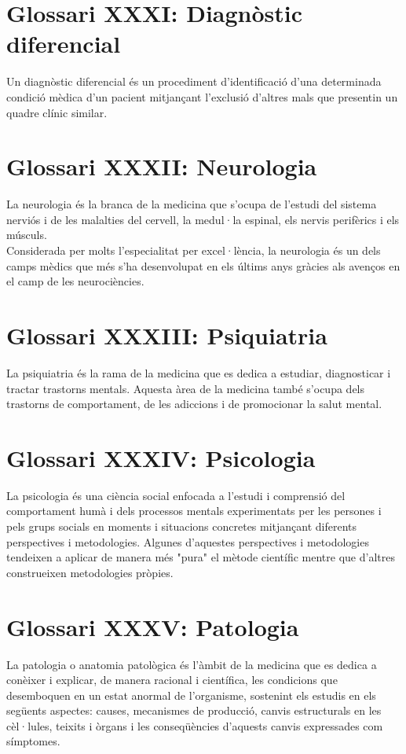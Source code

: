 \documentclass[a4paper,12pt]{report}
\begin{document}
\section*{Glossari XXXI: Diagnòstic diferencial}
Un diagnòstic diferencial és un procediment d'identificació d'una determinada condició mèdica d'un pacient mitjançant l'exclusió d'altres mals que presentin un quadre clínic similar.
\section*{Glossari XXXII: Neurologia}
La neurologia és la branca de la medicina que s'ocupa de l'estudi del sistema nerviós i de les malalties del cervell, la medul·la espinal, els nervis perifèrics i els músculs.\\
Considerada per molts l'especialitat per excel·lència, la neurologia és un dels camps mèdics que més s'ha desenvolupat en els últims anys gràcies als avenços en el camp de les neurociències.
\section*{Glossari XXXIII: Psiquiatria}
La psiquiatria és la rama de la medicina que es dedica a estudiar, diagnosticar i tractar trastorns mentals. Aquesta àrea de la medicina també s'ocupa dels trastorns de comportament, de les adiccions i de promocionar la salut mental.
\section*{Glossari XXXIV: Psicologia}
La psicologia és una ciència social enfocada a l'estudi i comprensió del comportament humà i dels processos mentals experimentats per les persones i pels grups socials en moments i situacions concretes mitjançant diferents perspectives i metodologies. Algunes d'aquestes perspectives i metodologies tendeixen a aplicar de manera més "pura" el mètode científic mentre que d'altres construeixen metodologies pròpies.
\section*{Glossari XXXV: Patologia}
La patologia o anatomia patològica és l'àmbit de la medicina que es dedica a conèixer i explicar, de manera racional i científica, les condicions que desemboquen en un estat anormal de l'organisme, sostenint els estudis en els següents aspectes: causes, mecanismes de producció, canvis estructurals en les cèl·lules, teixits i òrgans i les conseqüències d'aquests canvis expressades com símptomes.
\end{document}
